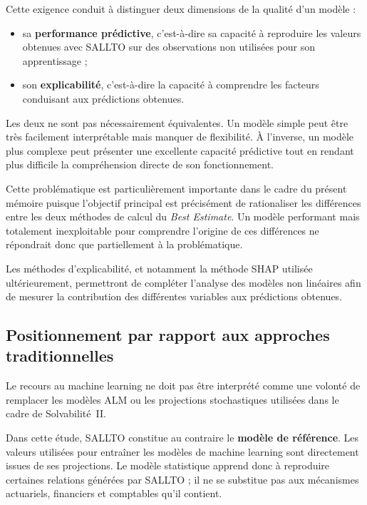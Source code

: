 Cette exigence conduit à distinguer deux dimensions de la qualité d'un modèle :

\begin{itemize}[noitemsep,topsep=2pt]
    \item sa \textbf{performance prédictive}, c'est-à-dire sa capacité à reproduire les valeurs obtenues avec SALLTO sur des observations non utilisées pour son apprentissage ;
    \item son \textbf{explicabilité}, c'est-à-dire la capacité à comprendre les facteurs conduisant aux prédictions obtenues.
\end{itemize}

Les deux ne sont pas nécessairement équivalentes. Un modèle simple peut être très facilement interprétable mais manquer de flexibilité. À l'inverse, un modèle plus complexe peut présenter une excellente capacité prédictive tout en rendant plus difficile la compréhension directe de son fonctionnement.

Cette problématique est particulièrement importante dans le cadre du présent mémoire puisque l'objectif principal est précisément de rationaliser les différences entre les deux méthodes de calcul du \textit{Best Estimate}. Un modèle performant mais totalement inexploitable pour comprendre l'origine de ces différences ne répondrait donc que partiellement à la problématique.

Les méthodes d'explicabilité, et notamment la méthode SHAP utilisée ultérieurement, permettront de compléter l'analyse des modèles non linéaires afin de mesurer la contribution des différentes variables aux prédictions obtenues.


\subsection{Positionnement par rapport aux approches traditionnelles}

Le recours au machine learning ne doit pas être interprété comme une volonté de remplacer les modèles ALM ou les projections stochastiques utilisées dans le cadre de Solvabilité~II.

Dans cette étude, SALLTO constitue au contraire le \textbf{modèle de référence}. Les valeurs utilisées pour entraîner les modèles de machine learning sont directement issues de ses projections. Le modèle statistique apprend donc à reproduire certaines relations générées par SALLTO ; il ne se substitue pas aux mécanismes actuariels, financiers et comptables qu'il contient.

